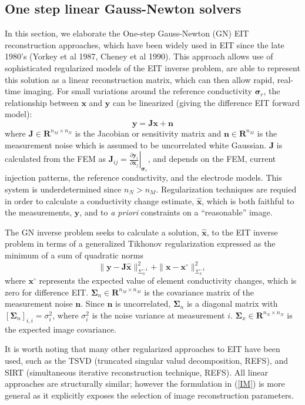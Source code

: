 \documentclass[12pt]{iopart}
\newcommand{\mathbb}{\mathbf}
\newcommand{\xB}{\mbox{$\mathbf{x}$}}
\newcommand{\xH}{\mbox{$\mathbf{\hat x}$}}
\newcommand{\nB}{\mbox{$\mathbf{n}$}}
\newcommand{\yB}{\mbox{$\mathbf{y}$}}
\newcommand{\JB}{\mbox{$\mathbf{J}$}}
\newcommand{\SG}{\mbox{${\mathbf \Sigma}$}}
\newcommand{\sG}{\mbox{${\mathbf \sigma}$}}
\begin{document}
\subsection{One step linear Gauss-Newton solvers}

In this section, we elaborate the
One-step Gauss-Newton (GN) EIT reconstruction approaches,
which have been
widely used in EIT since the late 1980's (Yorkey et al 1987,
Cheney et al 1990).
This approach allows use of sophisticated regularized models
of the EIT inverse problem, are able to represent this
solution as a linear reconstruction matrix, which can then allow
rapid, real-time imaging.
For small variations around the reference
conductivity $\sG_r$, the relationship between $\xB$ and $\yB$ can
be linearized (giving the difference EIT forward model):
\begin{equation}\label{FM}
\yB=\JB\xB+\nB
\end{equation}
where
$\JB\in\mathbb{R}^{n_M\times n_N}$ is the Jacobian or sensitivity
matrix and $\nB\in\mathbb{R}^{n_M}$ is the measurement noise which is
assumed to be uncorrelated white Gaussian. $\JB$ is calculated from
the FEM as
$\JB_{ij}=\left.
     \frac{\partial\yB_i}{\partial\xB_j}
          \right|_{\sG_r}$,
and depends on the FEM, current injection patterns, the reference
conductivity, and the electrode models. This system is
underdetermined since $n_N > n_M$. 
Regularization techniques are requied
in order to calculate a conductivity change
estimate, $\xH$, which is both
faithful to the measurements, $\yB$, and to
{\em a priori} constraints on a ``reasonable'' image.

The GN inverse problem seeks to
calculate a solution, $\xH$, to the EIT inverse problem
in terms of a generalized Tikhonov regularization 
expressed as the minimum of a sum of quadratic norms
\begin{equation}\label{IM}
 \|\yB-\JB\xH\|_{\Sigma_n^{-1}}^2 +
 \|\xB-\xB^\circ\|_{\Sigma_x^{-1}}^2
\end{equation}
where $\xB^\circ$ represents the expected value of element
conductivity changes, which is zero for  difference EIT.
$\SG_n\in\mathbb{R}^{n_M\times n_M}$ is
 the covariance matrix of the measurement noise $\nB$. Since
$\nB$ is uncorrelated, $\SG_n$ is a diagonal matrix with
$[\SG_n]_{i,i}=\sigma_i^2$, where $\sigma_i^2$ is the noise variance at
measurement $i$. $\SG_x\in\mathbb{R}^{n_N\times
n_N}$ is the expected image covariance.

It is worth noting that many other regularized approaches
to EIT have been used, such as the
TSVD (truncated singular valud decomposition, REFS),
and
SIRT (simultaneous iterative reconstruction technique, REFS).
All linear approaches are structurally similar; however
the formulation in (\ref{IM}) is more general
as it explicitly exposes the selection of image reconstruction
parameters.
\end{document}
